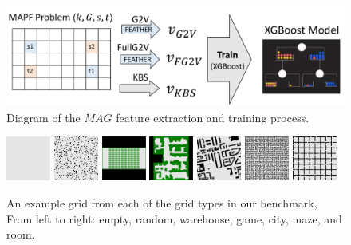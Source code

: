 \documentclass[letterpaper]{article} %
\newcommand{\Roni}[1]{}
\newcommand{\mapfgas}[1]{\ensuremath{\textit{MAG}}\xspace}
\begin{document}


\begin{figure}
    \centering
    \includegraphics[width=\columnwidth]{Images/MGS-Diagram-New.pdf}
    \caption{Diagram of the \mapfgas\ feature extraction and training process.}
    \label{fig:mgs-features}
\end{figure}
\begin{figure}
    \centering
    \includegraphics[width=0.13\textwidth]{Images/empty-16-16.pdf}\enspace
    \includegraphics[width=0.13\textwidth]{Images/random-64-64-10.pdf}\enspace
    \includegraphics[width=0.13\textwidth]{Images/warehouse-10-20-10-2-2.pdf}\enspace
    \includegraphics[width=0.13\textwidth]{Images/game-den312d.pdf}\enspace
    \includegraphics[width=0.13\textwidth]{Images/city-Berlin_1_256.pdf}\enspace
    \includegraphics[width=0.13\textwidth]{Images/maze-128-128-2.pdf}\enspace
    \includegraphics[width=0.13\textwidth]{Images/room-64-64-8.pdf}
    \caption{An example grid from each of the grid types in our benchmark, From left to right: empty, random, warehouse, game, city, maze, and room.}
    \label{fig:grid-types}
\end{figure}
\end{document}
